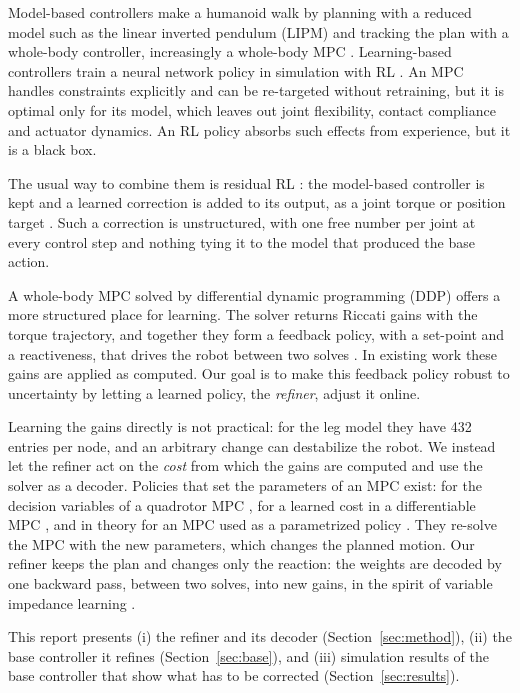 \documentclass[conference]{IEEEtran}
\begin{document}
Model-based controllers make a humanoid walk by planning with a reduced model such as the linear inverted pendulum (LIPM) \cite{kajita2001lipm} and tracking the plan with a whole-body controller, increasingly a whole-body MPC \cite{mastalli2020crocoddyl,dantec2022wbmpc}.
Learning-based controllers train a neural network policy in simulation with RL \cite{radosavovic2024humanoid}.
An MPC handles constraints explicitly and can be re-targeted without retraining, but it is optimal only for its model, which leaves out joint flexibility, contact compliance and actuator dynamics.
An RL policy absorbs such effects from experience, but it is a black box.

The usual way to combine them is residual RL \cite{johannink2019residual}: the model-based controller is kept and a learned correction is added to its output, as a joint torque or position target \cite{jenelten2024dtc,jeon2025residualmpc}.
Such a correction is unstructured, with one free number per joint at every control step and nothing tying it to the model that produced the base action.

A whole-body MPC solved by differential dynamic programming (DDP) \cite{mayne1966ddp} offers a more structured place for learning.
The solver returns Riccati gains with the torque trajectory, and together they form a feedback policy, with a set-point and a reactiveness, that drives the robot between two solves \cite{grandia2019feedback,dantec2022firstorder}.
In existing work these gains are applied as computed.
Our goal is to make this feedback policy robust to uncertainty by letting a learned policy, the \emph{refiner}, adjust it online.

Learning the gains directly is not practical: for the leg model they have 432 entries per node, and an arbitrary change can destabilize the robot.
We instead let the refiner act on the \emph{cost} from which the gains are computed and use the solver as a decoder.
Policies that set the parameters of an MPC exist: for the decision variables of a quadrotor MPC \cite{song2022policysearch}, for a learned cost in a differentiable MPC \cite{romero2024acmpc}, and in theory for an MPC used as a parametrized policy \cite{gros2020nmpcrl}.
They re-solve the MPC with the new parameters, which changes the planned motion.
Our refiner keeps the plan and changes only the reaction: the weights are decoded by one backward pass, between two solves, into new gains, in the spirit of variable impedance learning \cite{buchli2011variable}.

This report presents (i) the refiner and its decoder (Section~\ref{sec:method}), (ii) the base controller it refines (Section~\ref{sec:base}), and (iii) simulation results of the base controller that show what has to be corrected (Section~\ref{sec:results}).
\end{document}
